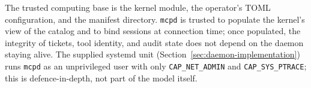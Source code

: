 The trusted computing base is the kernel module, the operator's TOML configuration, and the manifest directory.
\texttt{mcpd} is trusted to populate the kernel's view of the catalog and to bind sessions at connection time; once populated, the integrity of tickets, tool identity, and audit state does not depend on the daemon staying alive.
The supplied systemd unit (Section~\ref{sec:daemon-implementation}) runs \texttt{mcpd} as an unprivileged user with only \texttt{CAP\_\allowbreak NET\_\allowbreak ADMIN} and \texttt{CAP\_\allowbreak SYS\_\allowbreak PTRACE}; this is defence-in-depth, not part of the model itself.
